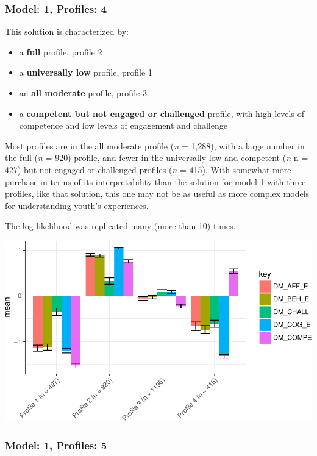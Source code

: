 \documentclass[]{msu-thesis}
\providecommand{\tightlist}{%
  \setlength{\itemsep}{0pt}\setlength{\parskip}{0pt}}
\theoremstyle{definition}
\theoremstyle{definition}
\theoremstyle{definition}
\theoremstyle{remark}
\begin{document}
\subsubsection{Model: 1, Profiles: 4}\label{model-1-profiles-4}

This solution is characterized by:

\begin{itemize}
\tightlist
\item
  a \textbf{full} profile, profile 2
\item
  a \textbf{universally low} profile, profile 1
\item
  an \textbf{all moderate} profile, profile 3.
\item
  a \textbf{competent but not engaged or challenged} profile, with high
  levels of competence and low levels of engagement and challenge
\end{itemize}

Most profiles are in the all moderate profile (\emph{n} = 1,288), with a
large number in the full (\emph{n} = 920) profile, and fewer in the
universally low and competent (\emph{n} n = 427) but not engaged or
challenged profiles (\emph{n} = 415). With somewhat more purchase in
terms of its interpretability than the solution for model 1 with three
profiles, like that solution, this one may not be as useful as more
complex models for understanding youth's experiences.

The log-likelihood was replicated many (more than 10) times.

\begin{center}\includegraphics[width=0.8\linewidth]{rosenberg-dissertation_files/figure-latex/m1_4p-1} \end{center}

\subsubsection{Model: 1, Profiles: 5}\label{model-1-profiles-5}
\end{document}
